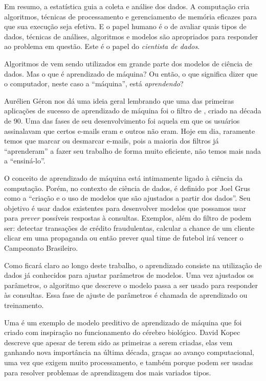 Em resumo, a estatística guia a coleta e análise dos dados. A computação cria algoritmos, técnicas de processamento e gerenciamento de memória eficazes para que sua execução seja efetiva. E o papel humano é o de avaliar quais tipos de dados, técnicas de análises, algoritmos e modelos são apropriados para responder ao problema em questão. Este é o papel do \emph{cientista de dados}.

Algoritmos de  vem sendo utilizados em grande parte dos modelos de ciência de dados. Mas o que é aprendizado de máquina? Ou então, o que significa dizer que o computador, neste caso a ``máquina'', está \emph{aprendendo}?

Aurélien Géron \citep{hands} nos dá uma ideia geral lembrando que uma das primeiras aplicações de sucesso de aprendizado de máquina foi o filtro de , criado na década de 90. Uma das fases de seu desenvolvimento foi aquela em que os usuários assinalavam que certos e-mails eram  e outros não eram. Hoje em dia, raramente temos que marcar ou desmarcar e-mails, pois a maioria dos filtros já ``aprenderam'' a fazer seu trabalho de forma muito eficiente, não temos mais nada a ``ensiná-lo''.

O conceito de aprendizado de máquina está intimamente ligado à ciência da computação. Porém, no contexto de ciência de dados, é definido por Joel Grus \citep{data} como a ``criação e o uso de modelos que são ajustados a partir dos dados''. Seu objetivo é usar dados existentes para desenvolver modelos que possamos usar para \emph{prever} possíveis respostas à consultas. Exemplos, além do filtro de  podem ser: detectar transações de crédito fraudulentas, calcular a chance de um cliente clicar em uma propaganda ou então prever qual time de futebol irá vencer o Campeonato Brasileiro.

Como ficará claro ao longo deste trabalho, o aprendizado consiste na utilização de dados já conhecidos para ajustar parâmetros de modelos. Uma vez ajustados os parâmetros, o algoritmo que descreve o modelo passa a ser usado para responder às consultas. Essa fase de ajuste de parâmetros é chamada de aprendizado ou treinamento. 

Uma  é um exemplo de modelo preditivo de aprendizado de máquina que foi criado com inspiração no funcionamento do cérebro biológico. David Kopec \citep{classic} descreve que apesar de terem sido as primeiras a serem criadas, elas vem ganhando nova importância na última década, graças ao avanço computacional, uma vez que exigem muito processamento, e também porque podem ser usadas para resolver problemas de aprendizagem dos mais variados tipos.

